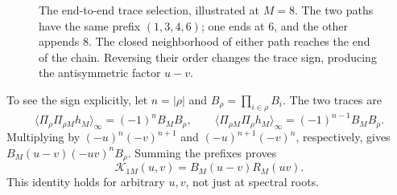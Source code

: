 \documentclass[11pt,a4paper]{article}
\newcommand{\av}[1]{\langle #1\rangle_\infty}
\newcommand{\Kern}{\mathcal K}
\begin{document}
\begin{figure}[t]
\centering
{}
\caption{The end-to-end trace selection, illustrated at $M=8$. The two paths have the same prefix $(1,3,4,6)$; one ends at $6$, and the other appends $8$. The closed neighborhood of either path reaches the end of the chain. Reversing their order changes the trace sign, producing the antisymmetric factor $u-v$.}
\label{fig:pair}
\end{figure}

To see the sign explicitly, let $n=|\rho|$ and $B_\rho=\prod_{i\in\rho}B_i$. The two traces are
\begin{equation}
 \av{\Pi_\rho\Pi_{\rho M}h_M}=(-1)^nB_MB_\rho,
 \qquad
 \av{\Pi_{\rho M}\Pi_\rho h_M}=(-1)^{n-1}B_MB_\rho.
\end{equation}
Multiplying by $(-u)^n(-v)^{n+1}$ and $(-u)^{n+1}(-v)^n$, respectively, gives
$B_M(u-v)(-uv)^nB_\rho$. Summing the prefixes proves
\begin{equation}
 \boxed{\Kern_{1M}(u,v)=B_M(u-v)R_M(uv).}
 \label{eq:endkernel}
\end{equation}
This identity holds for arbitrary $u,v$, not just at spectral roots.
\end{document}
